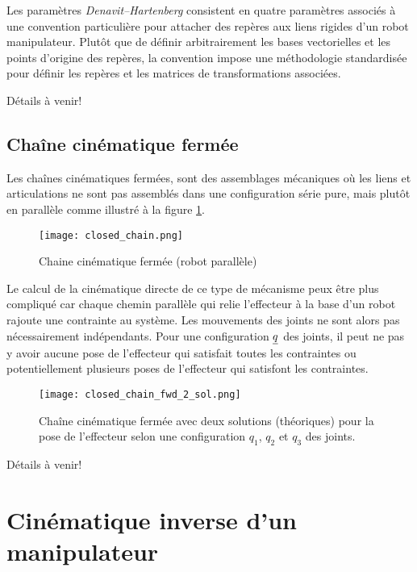 Les paramètres \textit{Denavit–Hartenberg} consistent en quatre paramètres associés à une convention particulière pour attacher des repères aux liens rigides d'un robot manipulateur. Plutôt que de définir arbitrairement les bases vectorielles et les points d'origine des repères, la convention impose une méthodologie standardisée pour définir les repères et les matrices de transformations associées. 

Détails à venir!


\newpage
\subsection{Chaîne cinématique fermée}

Les chaînes cinématiques fermées, sont des assemblages mécaniques où les liens et articulations ne sont pas assemblés dans une configuration série pure, mais plutôt en parallèle comme illustré à la figure \ref{fig:closed_chain}.
\begin{figure}[H]
	\centering
		\texttt{[image: closed\_chain.png]}
	\caption{Chaine cinématique fermée (robot parallèle)}
	\label{fig:closed_chain}
\end{figure}

Le calcul de la cinématique directe de ce type de mécanisme peux être plus compliqué car chaque chemin parallèle qui relie l'effecteur à la base d'un robot rajoute une contrainte au système. Les mouvements des joints ne sont alors pas nécessairement indépendants. Pour une configuration $\underline{q}$ des joints, il peut ne pas y avoir aucune pose de l'effecteur qui satisfait toutes les contraintes ou potentiellement plusieurs poses de l'effecteur qui satisfont les contraintes.
\begin{figure}[H]
	\centering
		\texttt{[image: closed\_chain\_fwd\_2\_sol.png]}
	\caption{Chaîne cinématique fermée avec deux solutions (théoriques) pour la pose de l'effecteur selon une configuration $q_1$, $q_2$ et $q_3$ des joints. }
	\label{fig:closed_chain_fwd_2_sol}
\end{figure}


Détails à venir!





\newpage
\section{Cinématique inverse d'un manipulateur}
\label{sec:invkin}

